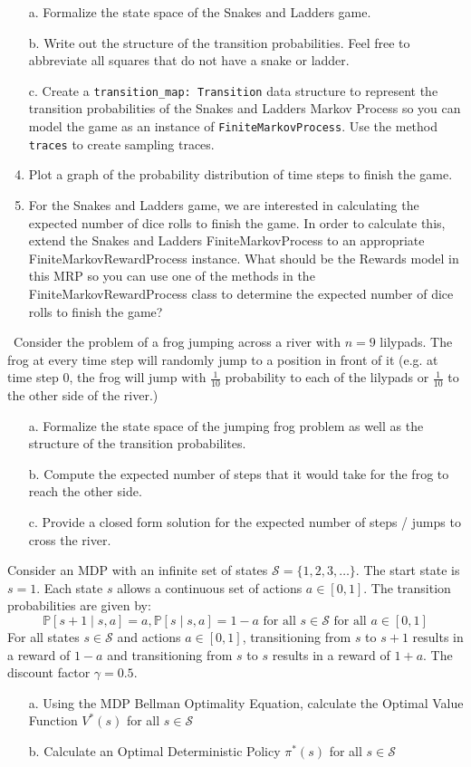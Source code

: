\documentclass[12pt]{exam}
\begin{document}
\begin{questions}
\begin{enumerate}
	\item[a.] Formalize the state space of the Snakes and Ladders game.
	\item[b.] Write out the structure of the transition probabilities. Feel free to abbreviate all squares that do not have a snake or ladder.
	\item[c.] Create a \lstinline{transition_map: Transition} data structure to represent the transition probabilities of the Snakes and Ladders Markov Process so you can model the game as an instance of \lstinline{FiniteMarkovProcess}. Use the method \lstinline{traces} to create sampling traces. 
	\item[d.] Plot a graph of the probability distribution of time steps to finish the game.
	\item[e.] For the Snakes and Ladders game, we are interested in calculating the expected number of dice rolls to finish the game. In order to calculate this, extend the Snakes and Ladders FiniteMarkovProcess to an appropriate FiniteMarkovRewardProcess instance. What should be the Rewards model in this MRP so you can use one of the methods in the FiniteMarkovRewardProcess class to determine the expected number of dice rolls to finish the game?
\end{enumerate}
\
\question Consider the problem of a frog jumping across a river with $n=9$ lilypads. The frog at every time step will randomly jump to a position in front of it (e.g. at time step 0, the frog will jump with $\frac{1}{10}$ probability to each of the lilypads or $\frac{1}{10}$ to the other side of the river.)
\begin{enumerate}
	\item[a.] Formalize the state space of the jumping frog problem as well as the structure of the transition probabilites.
	\item[b.] Compute the expected number of steps that it would take for the frog to reach the other side.
	\item[c.] Provide a closed form solution for the expected number of steps / jumps to cross the river.
\end{enumerate}

 \question Consider an MDP with an infinite set of states $\mathcal{S} = \{1,2,3,\ldots \}$. The start state is $s=1$. Each state $s$ allows a continuous set of actions $a \in [0,1]$. The transition probabilities are given by: $$\mathbb{P}[s+1 \mid s, a] = a, \mathbb{P}[s \mid s, a] = 1 - a \mbox{ for all } s \in \mathcal{S} \mbox{ for all } a \in [0,1]$$
For all states $s \in \mathcal{S}$ and actions $a \in [0,1]$, transitioning from $s$ to $s+1$ results in a reward of $1-a$ and transitioning from $s$ to $s$ results in a reward of $1+a$. The discount factor $\gamma=0.5$.
\begin{enumerate}
	\item[a.] Using the MDP Bellman Optimality Equation, calculate the Optimal Value Function $V^*(s)$ for all $s \in \mathcal{S}$
	\item[b.] Calculate an Optimal Deterministic Policy $\pi^*(s)$ for all $s \in \mathcal{S}$
\end{enumerate}


\end{questions}
\end{document}
